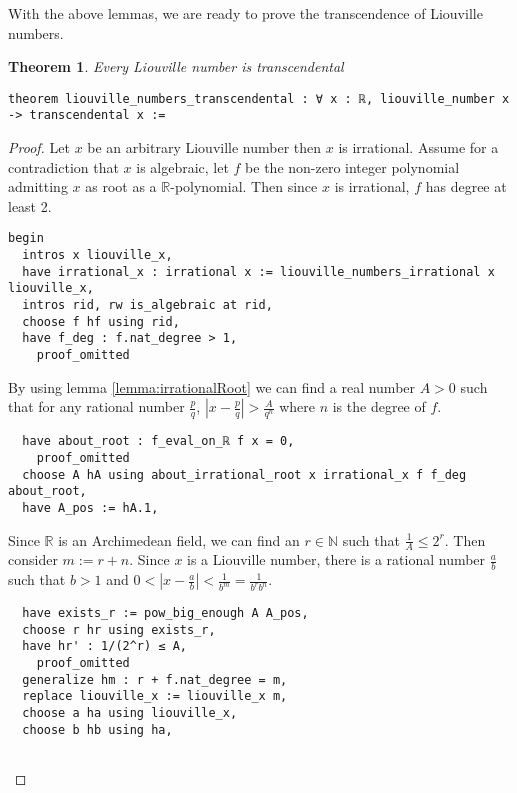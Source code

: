 \documentclass{report}
\theoremstyle{definition}
\theoremstyle{plain}
\newtheorem{theorem}{Theorem}[section]
\begin{document}
With the above lemmas, we are ready to prove the transcendence of Liouville numbers.
\begin{theorem}\label{thm:liouvilleTrans}
Every Liouville number is transcendental
\begin{verbatim}
theorem liouville_numbers_transcendental : ∀ x : ℝ, liouville_number x -> transcendental x := 
\end{verbatim}
\end{theorem}

\begin{proof}
Let $x$ be an arbitrary Liouville number then $x$ is irrational. Assume for a contradiction that $x$ is algebraic, let $f$ be the non-zero integer polynomial admitting $x$ as root as a $\mathbb R$-polynomial. Then since $x$ is irrational, $f$ has degree at least 2.

\begin{verbatim}
begin
  intros x liouville_x,
  have irrational_x : irrational x := liouville_numbers_irrational x liouville_x,
  intros rid, rw is_algebraic at rid,
  choose f hf using rid, 
  have f_deg : f.nat_degree > 1,
    proof_omitted
\end{verbatim}

By using lemma \ref{lemma:irrationalRoot} we can find a real number $A>0$ such that for any rational number $\frac pq$, $\left|x-\frac pq\right|>\frac A{q^n}$ where $n$ is the degree of $f$.
\begin{verbatim} 
  have about_root : f_eval_on_ℝ f x = 0,
    proof_omitted
  choose A hA using about_irrational_root x irrational_x f f_deg about_root,
  have A_pos := hA.1,
\end{verbatim}

Since $\mathbb R$ is an Archimedean field, we can find an $r\in\mathbb N$ such that $\frac1A\le2^r$. Then consider $m:=r+n$. Since $x$ is a Liouville number, there is a rational number $\frac a b$ such that $b>1$ and $0<\left|x-\frac a b\right|<\frac1{b^m}=\frac1{b^r b^n}$.
\begin{verbatim} 
  have exists_r := pow_big_enough A A_pos, 
  choose r hr using exists_r,
  have hr' : 1/(2^r) ≤ A,
    proof_omitted
  generalize hm : r + f.nat_degree = m,
  replace liouville_x := liouville_x m,
  choose a ha using liouville_x,
  choose b hb using ha,


\end{verbatim}
\end{proof}
\end{document}
